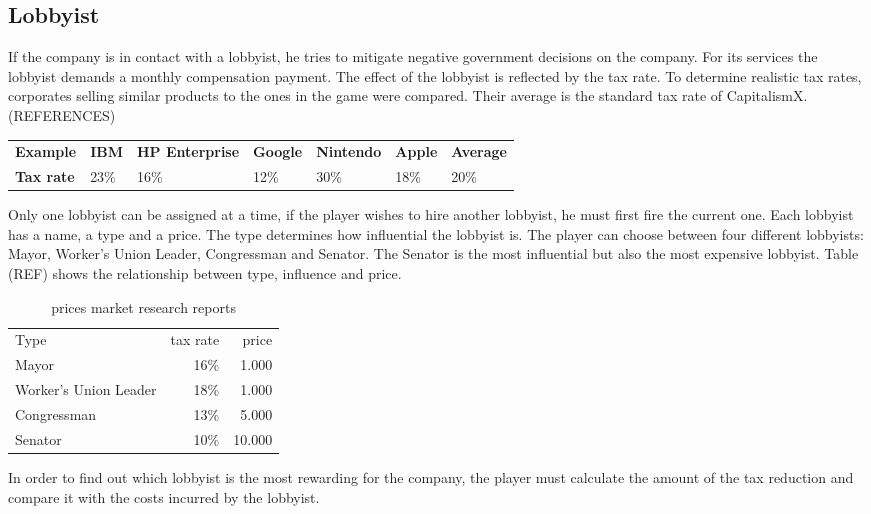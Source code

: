 \subsection{Lobbyist}
If the company is in contact with a lobbyist, he tries to mitigate negative government decisions on the company. For its services the lobbyist demands a monthly compensation payment. The effect of the lobbyist is reflected by the tax rate. 
To determine realistic tax rates, corporates selling similar products to the ones in the game were compared. Their average is the standard tax rate of CapitalismX. (REFERENCES)

\begin{table}[]
\begin{tabular}{lllllll}
\textbf{Example}    & \textbf{IBM} & \textbf{HP Enterprise} & \textbf{Google} & \textbf{Nintendo} & \textbf{Apple} & \textbf{Average} \\
\textbf{Tax rate}   & 23\%         & 16\%                   & 12\%            & 30\%              & 18\%           & 20\%            
\end{tabular}
\end{table}

Only one lobbyist can be assigned at a time, if the player wishes to hire another lobbyist, he must first fire the current one. Each lobbyist has a name, a type and a price. The type determines how influential the lobbyist is. The player can choose between four different lobbyists: Mayor, Worker’s Union Leader, Congressman and Senator. The Senator is the most influential but also the most expensive lobbyist. Table (REF) shows the relationship between type, influence and price. 

\begin{table}[ht]
\centering
\begin{tabular}{|l|r|r|}
\hline
Type                    & tax rate  & price \\
Mayor                   & 16\%      & 1.000     \\
Worker's Union Leader   & 18\%      & 1.000     \\
Congressman             & 13\%      & 5.000     \\
Senator                 & 10\%      & 10.000     \\
\hline
\end{tabular}
\caption{prices market research reports}
\label{MR_report_price}
\end{table}

In order to find out which lobbyist is the most rewarding for the company, the player must calculate the amount of the tax reduction and compare it with the costs incurred by the lobbyist.
 



 




